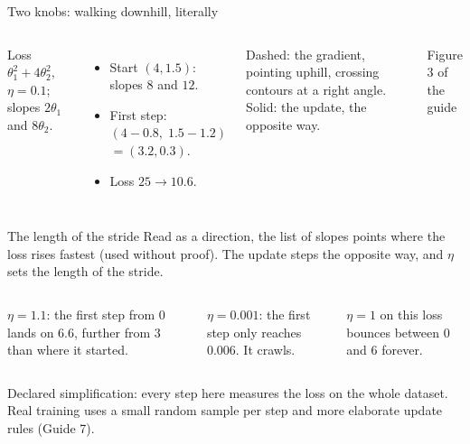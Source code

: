 \documentclass[aspectratio=169,11pt,t,\primeropts]{beamer}
\begin{document}
\begin{frame}{Two knobs: walking downhill, literally}
  \begin{columns}[T]
    \footnotesize
    Loss $\theta_1^2 + 4\theta_2^2$, $\eta = 0.1$; slopes $2\theta_1$ and $8\theta_2$.
    \begin{itemize}
      \item Start $(4, 1.5)$: slopes $8$ and $12$.
      \item First step: $(4 - 0.8,\; 1.5 - 1.2)$ $= (3.2, 0.3)$.
      \item Loss $25 \to 10.6$.
    \end{itemize}
    Dashed: the gradient, pointing uphill, crossing contours at a right angle. Solid: the
    update, the opposite way.
    \vspace{2mm}

    {\color{primerMuted}Figure 3 of the guide}
    \vspace{-5mm}
  \end{columns}
\end{frame}

\begin{frame}{The length of the stride}
  Read as a direction, the list of slopes points where the loss rises fastest (used without
  proof). The update steps the opposite way, and $\eta$ sets the length of the stride.
  \vspace{2mm}
  \begin{columns}[T]
    \begin{keyidea}
      $\eta = 1.1$: the first step from $0$ lands on $6.6$, further from $3$ than where it
      started.
    \end{keyidea}
    \begin{keyidea}
      $\eta = 0.001$: the first step only reaches $0.006$. It crawls.
    \end{keyidea}
    \begin{keyidea}
      $\eta = 1$ on this loss bounces between $0$ and $6$ forever.
    \end{keyidea}
  \end{columns}
  \vspace{3mm}

  {\small\color{primerMuted}Declared simplification: every step here measures the loss on the
  whole dataset. Real training uses a small random sample per step and more elaborate update
  rules (Guide 7).}
\end{frame}
\end{document}
